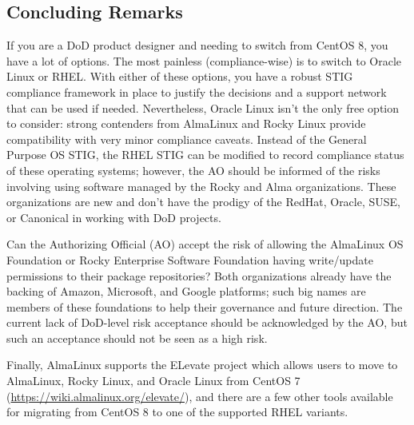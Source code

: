 \subsection{Concluding Remarks}

If you are a DoD product designer and needing to switch from CentOS 8, you have a lot of options. The most painless (compliance-wise) is to switch to Oracle Linux or RHEL. With either of these options, you have a robust STIG compliance framework in place to justify the decisions and a support network that can be used if needed. Nevertheless, Oracle Linux isn't the only free option to consider: strong contenders from AlmaLinux and Rocky Linux provide compatibility with very minor compliance caveats. Instead of the General Purpose OS STIG, the RHEL STIG can be modified to record compliance status of these operating systems; however, the AO should be informed of the risks involving using software managed by the Rocky and Alma organizations. These organizations are new and don't have the prodigy of the RedHat, Oracle, SUSE, or Canonical in working with DoD projects.

Can the Authorizing Official (AO) accept the risk of allowing the AlmaLinux OS Foundation or Rocky Enterprise Software Foundation having write/update permissions to their package repositories? Both organizations already have the backing of Amazon, Microsoft, and Google platforms; such big names are members of these foundations to help their governance and future direction. The current lack of DoD-level risk acceptance should be acknowledged by the AO, but such an acceptance should not be seen as a high risk.

Finally, AlmaLinux supports the ELevate project which allows users to move to AlmaLinux, Rocky Linux, and Oracle Linux from CentOS 7 (\url{https://wiki.almalinux.org/elevate/}), and there are a few other tools available for migrating from CentOS 8 to one of the supported RHEL variants.
